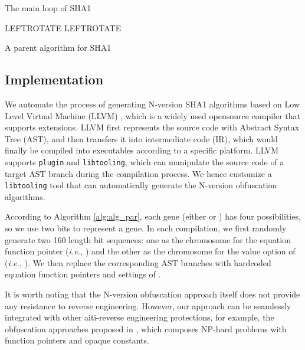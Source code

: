 \documentclass[10pt, conference]{IEEEtran}
\begin{document}
\begin{algorithm} [th]
\label{alg:ori_sha1}
\caption{The main loop of SHA1}
\small
\For {}	{
	 LEFTROTATE \;
	\;
	\;
	 LEFTROTATE  \;
	\;
	\;
}
\end{algorithm}

\begin{algorithm} [th]
\label{alg:alg_par}
\caption{A parent algorithm for SHA1}
\small
\KwData {}

\end{algorithm}

\subsection{Implementation}
We automate the process of generating N-version SHA1 algorithms based on Low Level Virtual Machine (LLVM) \cite{llvm}, which is a widely used opensource compiler that supports extensions.  LLVM first represents the source code with Abstract Syntax Tree (AST), and then transfers it into intermediate code (IR), which would finally be compiled into executables according to a specific platform.  LLVM supports \texttt{plugin} and \texttt{libtooling}, which can manipulate the source code of a target AST branch during the compilation process.  We hence customize a \texttt{libtooling} tool that can automatically generate the N-version obfuscation algorithms.  

According to Algorithm \ref{alg:alg_par}, each gene (either  or ) has four possibilities, so we use two bits to represent a gene.  In each compilation, we first randomly generate two 160 length bit sequences: one as the chromosome for the equation function pointer (\textit{i.e.,} ) and the other as the chromosome for the value option of  (\textit{i.e.,} ).  We then replace the corresponding AST branches with hardcoded equation function pointers and settings of .  

It is worth noting that the N-version obfuscation approach itself does not provide any resistance to reverse engineering.  However, our approach can be seamlessly integrated with other aiti-reverse engineering protections, for example, the obfuscation approaches proposed in \cite{ogiso2003software}, which composes NP-hard problems with function pointers and opaque constants.  
\end{document}
